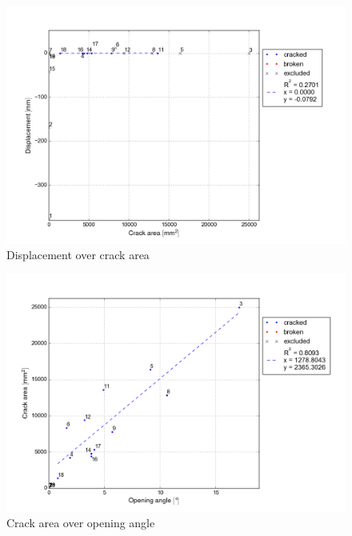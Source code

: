 \begin{figure}
    \centering
    \includegraphics[width=0.95 \linewidth]{./diagram/Displacement_Crack-area}
    \caption{Displacement over crack area}
    \label{fig:Displacement_Crack-area}
\end{figure}

\begin{figure}
    \centering
    \includegraphics[width=0.95 \linewidth]{diagram/Crack-area_Opening-angle.png}
    \caption{Crack area over opening angle}
    \label{fig:Crack-area_Opening-angle}
\end{figure}


